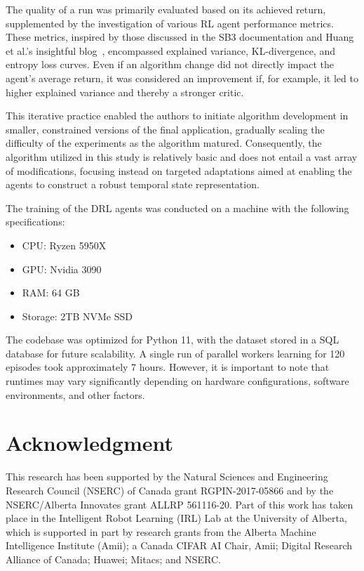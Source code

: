 \documentclass[preprint, 12pt]{elsarticle}
\begin{document}
The quality of a run was primarily evaluated based on its achieved return, supplemented by the investigation of various RL agent performance metrics.
These metrics, inspired by those discussed in the SB3 documentation and Huang et al.'s insightful blog~\cite{Huang_PPOReimplementation}, encompassed explained variance, KL-divergence, and entropy loss curves.
Even if an algorithm change did not directly impact the agent's average return, it was considered an improvement if, for example, it led to higher explained variance and thereby a stronger critic.

This iterative practice enabled the authors to initiate algorithm development in smaller, constrained versions of the final application, gradually scaling the difficulty of the experiments as the algorithm matured.
Consequently, the algorithm utilized in this study is relatively basic and does not entail a vast array of modifications, focusing instead on targeted adaptations aimed at enabling the agents to construct a robust temporal state representation.

The training of the DRL agents was conducted on a machine with the following specifications:
\begin{itemize}
    \item CPU: Ryzen 5950X
    \item GPU: Nvidia 3090
    \item RAM: 64 GB
    \item Storage: 2TB NVMe SSD
\end{itemize}
The codebase was optimized for Python 11, with the dataset stored in a SQL database for future scalability. A single run of parallel workers learning for 120 episodes took approximately 7 hours. However, it is important to note that runtimes may vary significantly depending on hardware configurations, software environments, and other factors.



\section*{Acknowledgment}

This research has been supported by the Natural Sciences and Engineering Research Council (NSERC) of Canada grant RGPIN-2017-05866 and by the  NSERC/Alberta Innovates grant ALLRP 561116-20. 
Part of this work has taken place in the Intelligent Robot Learning (IRL) Lab at the University of Alberta, which is supported in part by research grants from the Alberta Machine Intelligence Institute (Amii); a Canada CIFAR AI Chair, Amii; Digital Research Alliance of Canada; Huawei; Mitacs; and NSERC.
\end{document}

